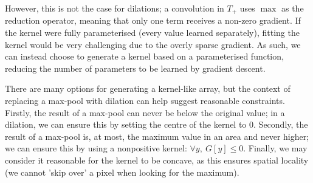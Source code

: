 \documentclass[a4paper, 12pt]{report}
\begin{document}
However, this is not the case for dilations; a convolution in $T_+$ uses $\max$ as the reduction operator, meaning that only one term receives a non-zero gradient. If the kernel were fully parameterised (every value learned separately), fitting the kernel would be very challenging due to the overly sparse gradient. As such, we can instead choose to generate a kernel based on a parameterised function, reducing the number of parameters to be learned by gradient descent.

There are many options for generating a kernel-like array, but the context of replacing a max-pool with dilation can help suggest reasonable constraints. Firstly, the result of a max-pool can never be below the original value; in a dilation, we can ensure this by setting the centre of the kernel to $0$. Secondly, the result of a max-pool is, at most, the maximum value in an area and never higher; we can ensure this by using a nonpositive kernel: $\forall y,~G[y] \leq 0$. Finally, we may consider it reasonable for the kernel to be concave, as this ensures spatial locality (we cannot 'skip over' a pixel when looking for the maximum).
\end{document}
